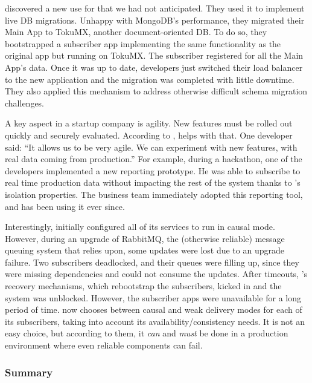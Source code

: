  \crowdtap discovered a new use for
\synapse that we had not anticipated.  They used it to implement live DB
migrations.  Unhappy with MongoDB's performance, they migrated their Main App to
TokuMX, another document-oriented DB.  To do so, they bootstrapped a subscriber
app implementing the same functionality as the original app but running on
TokuMX. The subscriber registered for all the Main App's data.  Once it was up
to date, developers just switched their load balancer to the new application and
the migration was completed with little downtime.  They also applied this
mechanism to address otherwise difficult schema migration challenges.

 A key aspect in a startup company is
agility.  New features must be rolled out quickly and securely evaluated.
According to \crowdtap, \synapse helps with that. One developer said: ``It
allows us to be very agile. We can experiment with new features, with real
data coming from production.''  For example, during a hackathon, one of the
developers implemented a new reporting prototype. He was able to subscribe to
real time production data without impacting the rest of the system thanks to
\synapse's isolation properties. The business team immediately adopted this
reporting tool, and has been using it ever since.

 Interestingly, \crowdtap initially
configured all of its services to run in causal mode.  However, during an
upgrade of RabbitMQ, the (otherwise reliable) message queuing system that
\synapse relies upon, some updates were lost due to an upgrade failure.
Two subscribers deadlocked, and their queues were filling up, since they were
missing dependencies and could not consume the updates.  After timeouts, \synapse's
recovery mechanisms, which rebootstrap the subscribers, kicked in
and the system was unblocked.  However, the subscriber apps were unavailable for
a long period of time. \crowdtap now chooses between causal and weak delivery
modes for each of its subscribers, taking into account its availability/consistency
needs.  It is not an easy choice, but according to them, it {\em can} and {\em must}
be done in a production environment where even reliable components can fail.

\subsubsection{Summary}

